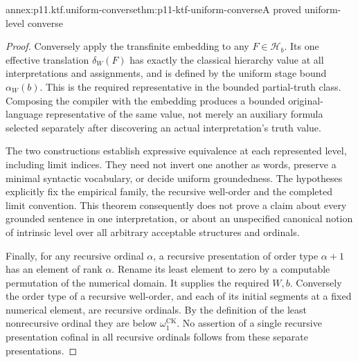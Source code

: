 \begin{annexitem}{annex:p11.ktf.uniform-converse}{thm:p11-ktf-uniform-converse}{A proved uniform-level converse}
\begin{proof}
Conversely apply the transfinite embedding to any
\(F\in\mathcal H_b\). Its one effective translation
\(\delta_W(F)\) has exactly the classical hierarchy value
at all interpretations and assignments, and is defined by the
uniform stage bound \(\alpha_W(b)\). This is the required
representative in the bounded partial-truth class. Composing the
compiler with the embedding produces a bounded original-language
representative of the same value, not merely an auxiliary formula
selected separately after discovering an actual interpretation's
truth value.

The two constructions establish expressive equivalence at each
represented level, including limit indices. They need not invert
one another as words, preserve a minimal syntactic vocabulary,
or decide uniform groundedness. The hypotheses explicitly fix
the empirical family, the recursive well-order and the completed
limit convention. This theorem consequently does not prove a
claim about every grounded sentence in one interpretation, or
about an unspecified canonical notion of intrinsic level over
all arbitrary acceptable structures and ordinals.

Finally, for any recursive ordinal \(\alpha\), a recursive
presentation of order type \(\alpha+1\) has an element of rank
\(\alpha\). Rename its least element to zero by a computable
permutation of the numerical domain. It supplies the required
\(W,b\). Conversely the order type of a recursive well-order,
and each of its initial segments at a fixed numerical element,
are recursive ordinals. By the definition of the least nonrecursive
ordinal they are below \(\omega_1^{\mathrm{CK}}\).
No assertion of a single recursive presentation cofinal in all
recursive ordinals follows from these separate presentations.
\end{proof}
\end{annexitem}

